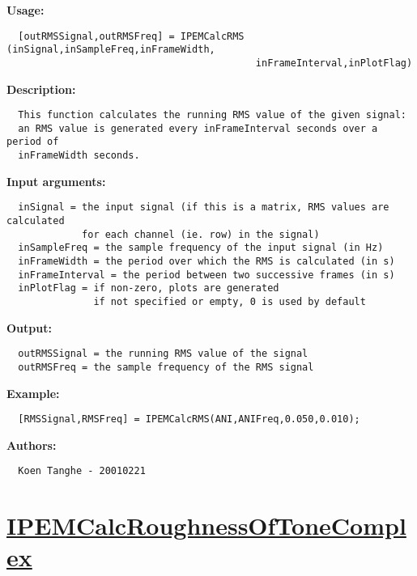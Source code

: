 \textbf{Usage:}
\begin{verbatim}  [outRMSSignal,outRMSFreq] = IPEMCalcRMS (inSignal,inSampleFreq,inFrameWidth,
                                           inFrameInterval,inPlotFlag)

\end{verbatim}
\textbf{Description:}
\begin{verbatim}  This function calculates the running RMS value of the given signal:
  an RMS value is generated every inFrameInterval seconds over a period of  
  inFrameWidth seconds.

\end{verbatim}
\textbf{Input arguments:}
\begin{verbatim}  inSignal = the input signal (if this is a matrix, RMS values are calculated
             for each channel (ie. row) in the signal)
  inSampleFreq = the sample frequency of the input signal (in Hz)
  inFrameWidth = the period over which the RMS is calculated (in s)
  inFrameInterval = the period between two successive frames (in s)
  inPlotFlag = if non-zero, plots are generated
               if not specified or empty, 0 is used by default

\end{verbatim}
\textbf{Output:}
\begin{verbatim}  outRMSSignal = the running RMS value of the signal
  outRMSFreq = the sample frequency of the RMS signal

\end{verbatim}
\textbf{Example:}
\begin{verbatim}  [RMSSignal,RMSFreq] = IPEMCalcRMS(ANI,ANIFreq,0.050,0.010);

\end{verbatim}
\textbf{Authors:}
\begin{verbatim}  Koen Tanghe - 20010221
\end{verbatim}


\newpage
\section*{\hyperlink{Concepts:IPEMCalcRoughnessOfToneComplex}{IPEMCalcRoughnessOfToneComplex}}
\hypertarget{FuncRef:IPEMCalcRoughnessOfToneComplex}{}

